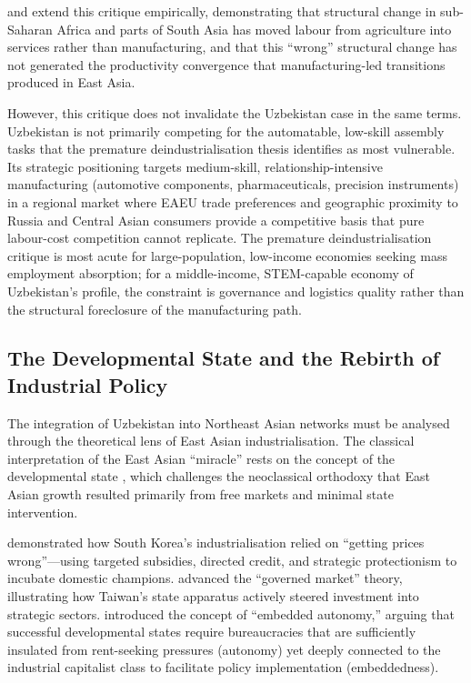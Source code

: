 \citet{diao2019} and \citet{mcmillan2017} extend this critique empirically, demonstrating that structural change in sub-Saharan Africa and parts of South Asia has moved labour from agriculture into services rather than manufacturing, and that this ``wrong'' structural change has not generated the productivity convergence that manufacturing-led transitions produced in East Asia.

However, this critique does not invalidate the Uzbekistan case in the same terms. Uzbekistan is not primarily competing for the automatable, low-skill assembly tasks that the premature deindustrialisation thesis identifies as most vulnerable. Its strategic positioning targets medium-skill, relationship-intensive manufacturing (automotive components, pharmaceuticals, precision instruments) in a regional market where EAEU trade preferences and geographic proximity to Russia and Central Asian consumers provide a competitive basis that pure labour-cost competition cannot replicate. The premature deindustrialisation critique is most acute for large-population, low-income economies seeking mass employment absorption; for a middle-income, STEM-capable economy of Uzbekistan's profile, the constraint is governance and logistics quality rather than the structural foreclosure of the manufacturing path.

\subsection{The Developmental State and the Rebirth of Industrial Policy}

The integration of Uzbekistan into Northeast Asian networks must be analysed through the theoretical lens of East Asian industrialisation. The classical interpretation of the East Asian ``miracle'' rests on the concept of the developmental state \citep{amsden1989, wade1990, evans1995}, which challenges the neoclassical orthodoxy that East Asian growth resulted primarily from free markets and minimal state intervention.

\citet{amsden1989} demonstrated how South Korea's industrialisation relied on ``getting prices wrong''---using targeted subsidies, directed credit, and strategic protectionism to incubate domestic champions. \citet{wade1990} advanced the ``governed market'' theory, illustrating how Taiwan's state apparatus actively steered investment into strategic sectors. \citet{evans1995} introduced the concept of ``embedded autonomy,'' arguing that successful developmental states require bureaucracies that are sufficiently insulated from rent-seeking pressures (autonomy) yet deeply connected to the industrial capitalist class to facilitate policy implementation (embeddedness).

